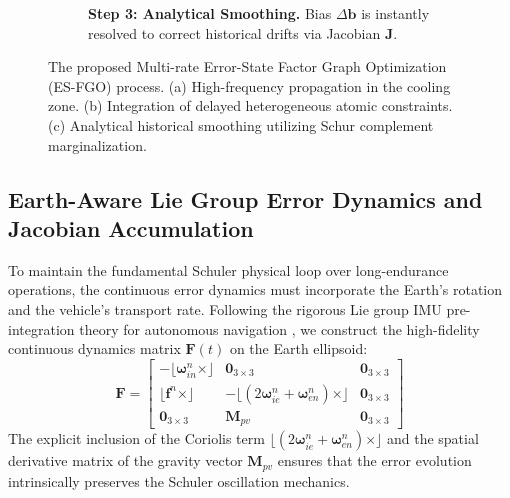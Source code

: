 \documentclass[journal]{IEEEtran}
\begin{document}
\begin{figure}[htbp]
\begin{subfigure}[b]{0.32\textwidth}
{
			}
			\caption{\textbf{Step 3: Analytical Smoothing.} Bias $\Delta \bm{b}$ is instantly resolved to correct historical drifts via Jacobian $\bm{J}$.}
		\end{subfigure}
		
		\caption{The proposed Multi-rate Error-State Factor Graph Optimization (ES-FGO) process. (a) High-frequency propagation in the cooling zone. (b) Integration of delayed heterogeneous atomic constraints. (c) Analytical historical smoothing utilizing Schur complement marginalization.}
		\label{fig:evolution_process}
	\end{figure}
	
	\subsection{Earth-Aware Lie Group Error Dynamics and Jacobian Accumulation}
	To maintain the fundamental Schuler physical loop over long-endurance operations, the continuous error dynamics must incorporate the Earth's rotation and the vehicle's transport rate. Following the rigorous Lie group IMU pre-integration theory for autonomous navigation \cite{b42, b61}, we construct the high-fidelity continuous dynamics matrix $\bm{F}(t)$ on the Earth ellipsoid:
	\begin{equation}
		\bm{F} = 
		\begin{bmatrix}
			-\lfloor \bm{\omega}_{in}^n \times \rfloor & \bm{0}_{3\times3} & \bm{0}_{3\times3} \\
			\lfloor \bm{f}^n \times \rfloor & -\lfloor (2\bm{\omega}_{ie}^n + \bm{\omega}_{en}^n) \times \rfloor & \bm{0}_{3\times3} \\
			\bm{0}_{3\times3} & \bm{M}_{pv} & \bm{0}_{3\times3}
		\end{bmatrix}
	\end{equation}
	The explicit inclusion of the Coriolis term $\lfloor (2\bm{\omega}_{ie}^n + \bm{\omega}_{en}^n) \times \rfloor$ and the spatial derivative matrix of the gravity vector $\bm{M}_{pv}$ ensures that the error evolution intrinsically preserves the Schuler oscillation mechanics.
	
\end{document}
